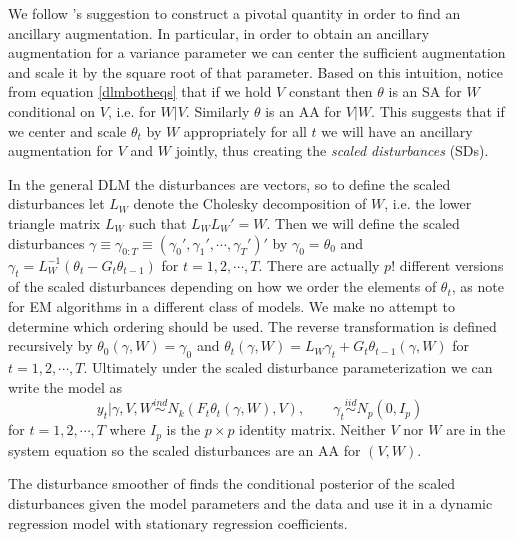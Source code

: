 \documentclass[12pt]{article}
\newcommand{\matt}[1]{{\color{red} Matt: #1}}
\begin{document}
We follow \citet{papaspiliopoulos2007general}'s suggestion to construct a pivotal quantity in order to find an ancillary augmentation. In particular, in order to obtain an ancillary augmentation for a variance parameter we can center the sufficient augmentation and scale it by the square root of that parameter. Based on this intuition, notice from equation \eqref{dlmbotheqs} that if we hold $V$ constant then $\theta$ is an SA for $W$ conditional on $V$, i.e. for $W|V$. Similarly $\theta$ is an AA for $V|W$. This suggests that if we center and scale $\theta_{t}$ by $W$ appropriately for all $t$ we will have an ancillary augmentation for $V$ and $W$ jointly, thus creating the {\it scaled disturbances} (SDs).

In the general DLM the disturbances are vectors, so to define the scaled disturbances let $L_W$ denote the Cholesky decomposition of $W$, i.e. the lower triangle matrix $L_W$ such that $L_WL_W' =W$. Then we will define the scaled disturbances $\gamma\equiv\gamma_{0:T}\equiv(\gamma_0',\gamma_1',\cdots,\gamma_T')'$ by $\gamma_0=\theta_0$ and $\gamma_t = L_W^{-1}(\theta_t-G_t\theta_{t-1})$ for $t=1,2,\cdots,T$. There are actually $p!$ different versions of the scaled disturbances depending on how we order the elements of $\theta_t$, as \citet{meng1998fast} note for EM algorithms in a different class of models. We make no attempt to determine which ordering should be used.
The reverse transformation is defined recursively by $\theta_0(\gamma,W)=\gamma_0$ and $\theta_t(\gamma,W)=L_W\gamma_t + G_t\theta_{t-1}(\gamma,W)$ for $t=1,2,\cdots,T$. Ultimately under the scaled disturbance parameterization we can write the model as
\begin{equation}
  y_t|\gamma,V,W  \stackrel{ind}{\sim} N_k\left(F_t\theta_t(\gamma,W), V\right), \qquad
  \gamma_t  \stackrel{iid}{\sim}N_p(0,I_p) \label{dlmdistmodel}
\end{equation}
for $t=1,2,\cdots,T$ where $I_p$ is the $p\times p$ identity matrix. Neither $V$ nor $W$ are in the system equation so the scaled disturbances are an AA for $(V,W)$.

The disturbance smoother of \citet{koopman1993disturbance} finds the conditional posterior of the scaled disturbances given the model parameters and the data and \citet{fruhwirth2004efficient} use it in a dynamic regression model with stationary regression coefficients.
\end{document}
